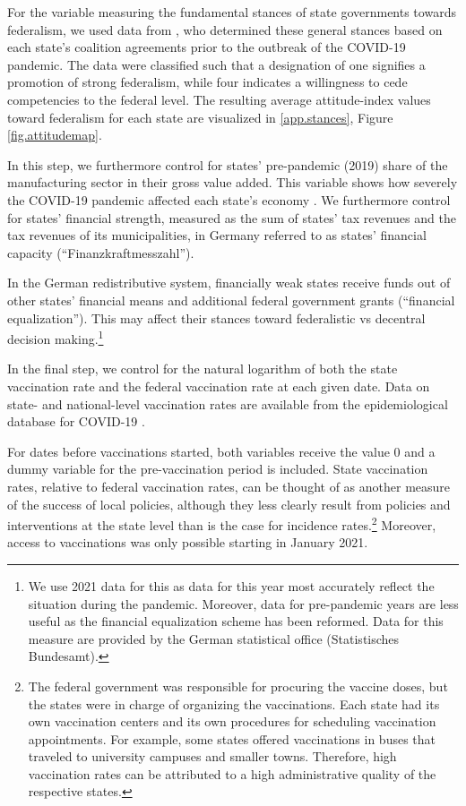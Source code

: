 \documentclass[authoryear,12pt, 3p]{elsarticle} %
\theoremstyle{break}
\begin{document}
For the variable measuring the fundamental stances of state governments towards federalism, we used data from \cite{BarbaroRode2024}, who determined these general stances based on each state's coalition agreements prior to the outbreak of the COVID-19 pandemic. The data were classified such that a designation of one signifies a promotion of strong federalism, while four indicates a willingness to cede competencies to the federal level. The resulting average attitude-index values toward federalism for each state are visualized in \ref{app.stances}, Figure \ref{fig.attitudemap}. 

In this step, we furthermore control for states’ pre-pandemic (2019) share of the manufacturing sector in their gross value added. This variable shows how severely the COVID-19 pandemic affected each state's economy \citep{Flach2020}. We furthermore control for states’ financial strength, measured as the sum of states’ tax revenues and the tax revenues of its municipalities, in Germany referred to as states’ financial capacity (“Finanzkraftmesszahl”). 

In the German redistributive system, financially weak states receive funds out of other states' financial means and additional federal government grants (“financial equalization”). This may affect their stances toward federalistic vs decentral decision making.\footnote{
	We use 2021 data for this as data for this year most accurately reflect the situation during the pandemic. Moreover, data for pre-pandemic years are less useful as the financial equalization scheme has been reformed. Data for this measure are provided by the German statistical office (Statistisches Bundesamt).
}  

In the final step, we control for the natural logarithm of both the state vaccination rate and the federal vaccination rate at each given date. Data on state- and national-level vaccination rates are available from the epidemiological database for COVID-19 \citep{Guidotti2022}. 

For dates before vaccinations started, both variables receive the value $0$ and a dummy variable for the pre-vaccination period is included. State vaccination rates, relative to federal vaccination rates, can be thought of as another measure of the success of local policies, although they less clearly result from policies and interventions at the state level than is the case for incidence rates.\footnote{
	The federal government was responsible for procuring the vaccine doses, but the states were in charge of organizing the vaccinations. Each state had its own vaccination centers and its own procedures for scheduling vaccination appointments. For example, some states offered vaccinations in buses that traveled to university campuses and smaller towns. Therefore, high vaccination rates can be attributed to a high administrative quality of the respective states.
} Moreover, access to vaccinations was only possible starting in January 2021.  
\end{document}
